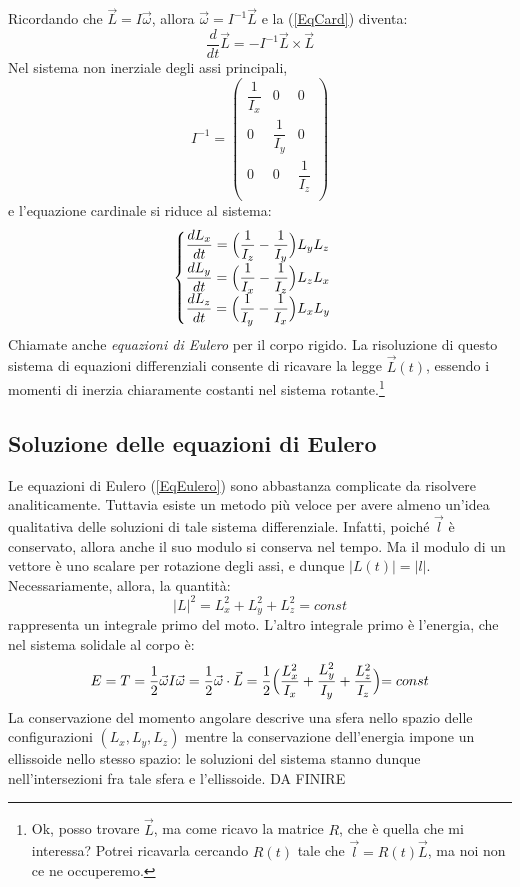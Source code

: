 \documentclass[a4paper,openany]{article}
\begin{document}
	
	Ricordando che $\vec{L} = I\vec{\omega}$, allora $\vec{\omega} = I^{-1}\vec{L}$ e la (\ref{EqCard}) diventa:
	\begin{equation}
		\dfrac{d}{dt}\vec{L} = -I^{-1}\vec{L}\times\vec{L}
		\label{EqCard}
	\end{equation}
	Nel sistema non inerziale degli assi principali,
	\begin{equation}\label{key}
		I^{-1} = 
		\begin{pmatrix}
			\dfrac{1}{I_{x}} & 0 & 0 \\
			0 & \dfrac{1}{I_y} & 0 \\
			0 & 0 & \dfrac{1}{I_z} \\
		\end{pmatrix}
	\end{equation}
	e l'equazione cardinale si riduce al sistema:
	\begin{equation}
		\begin{cases}
			\dfrac{dL_x}{dt} = \Bigl(\dfrac{1}{I_z}-\dfrac{1}{I_y}\Bigl) L_yL_z \\
			\dfrac{dL_y}{dt} = \Bigl(\dfrac{1}{I_x}-\dfrac{1}{I_z}\Bigl) L_zL_x \\
			\dfrac{dL_z}{dt} = \Bigl(\dfrac{1}{I_y}-\dfrac{1}{I_x}\Bigl) L_xL_y
		\end{cases}
		\label{EqEulero}
	\end{equation}
	Chiamate anche \textit{equazioni di Eulero} per il corpo rigido. La risoluzione di questo sistema di equazioni differenziali consente di ricavare la legge $\vec{L}(t)$, essendo i momenti di inerzia chiaramente costanti nel sistema rotante.\footnote{Ok, posso trovare $\vec{L}$, ma come ricavo la matrice $R$, che è quella che mi interessa? Potrei ricavarla cercando $R(t)$ tale che $\vec{l} = R(t)\vec{L}$, ma noi non ce ne occuperemo.}
	\subsection{Soluzione delle equazioni di Eulero}
	Le equazioni di Eulero (\ref{EqEulero}) sono abbastanza complicate da risolvere analiticamente. Tuttavia esiste un metodo più veloce per avere almeno un'idea qualitativa delle soluzioni di tale sistema differenziale. Infatti, poiché $\vec{l}$ è conservato, allora anche il suo modulo si conserva nel tempo. Ma il modulo di un vettore è uno scalare per rotazione degli assi, e dunque $|L(t)| = |l|$. Necessariamente, allora, la quantità:
	$$
	|L|^{2} = L_x^2 + L_y^2 +L_z^2 = const
	$$
	rappresenta un integrale primo del moto. L'altro integrale primo è l'energia, che nel sistema solidale al corpo è:
	$$
	E = T = \dfrac{1}{2}\vec{\omega}I\vec{\omega} = \dfrac{1}{2}\vec{\omega}\cdot\vec{L} = \dfrac{1}{2}\Bigl(\dfrac{L_x^2}{I_x} +\dfrac{L_y^2}{I_y}+\dfrac{L_z^2}{I_z}\Bigl) = const
	$$
	La conservazione del momento angolare descrive una sfera nello spazio delle configurazioni $(L_x,L_y,L_z)$ mentre la conservazione dell'energia impone un ellissoide nello stesso spazio: le soluzioni del sistema stanno dunque nell'intersezioni fra tale sfera e l'ellissoide.
	DA FINIRE
\end{document}

